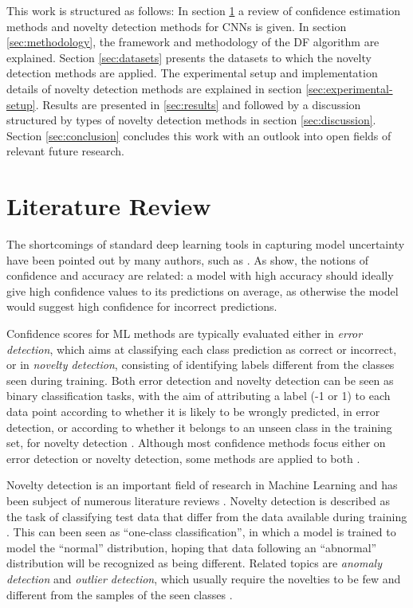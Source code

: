 \documentclass[10pt]{article}
\begin{document}
This work is structured as follows: In section \ref{sec:lit} a review of confidence estimation methods and novelty detection methods for \glspl{CNN} is given. In section \ref{sec:methodology}, the framework and methodology of the \acrlong{DF} algorithm are explained. Section \ref{sec:datasets} presents the datasets to which the novelty detection methods are applied. The experimental setup and implementation details of novelty detection methods are explained in section \ref{sec:experimental-setup}. Results are presented in \ref{sec:results} and followed by a discussion structured by types of novelty detection methods in section \ref{sec:discussion}. Section \ref{sec:conclusion} concludes this work with an outlook into open fields of relevant future research.

\section{Literature Review}
\label{sec:lit}

The shortcomings of standard deep learning tools in capturing model uncertainty have been pointed out by many authors, such as \textcite{ghahramani, NguyenYC14, mandelbaum17}. As \textcite{subramanya} show, the notions of confidence and accuracy are related: a model with high accuracy should ideally give high confidence values to its predictions on average, as otherwise the model would suggest high confidence for incorrect predictions.

Confidence scores for \gls{ML} methods are typically evaluated either in \textit{error detection}, which aims at classifying each class prediction as correct or incorrect, or in \textit{novelty detection}, consisting of identifying labels different from the classes seen during training. Both error detection and novelty detection can be seen as binary classification tasks, with the aim of attributing a label (-1 or 1) to each data point according to whether it is likely to be wrongly predicted, in error detection, or according to whether it belongs to an unseen class in the training set, for novelty detection \cite{Bahat_2018, mandelbaum17}. Although most confidence methods focus either on error detection or novelty detection, some methods are applied to both \cite{Sun2018KSconfA, Bahat_2018, mandelbaum17}.

Novelty detection is an important field of research in Machine Learning and has been subject of numerous literature reviews \cite{Bishop1994NoveltyDA, Markou2003NoveltyDApt1,Markou2003NoveltyDApt2,Pimentel2014ARO, deMorsier2014thesis}. Novelty detection is described as the task of classifying test data that differ from the data available during training \cite{Pimentel2014ARO}. This can been seen as ``one-class classification'', in which a model is trained to model the ``normal'' distribution, hoping that data following an ``abnormal'' distribution will be recognized as being different. Related topics are  \textit{anomaly detection} and \textit{outlier detection}, which usually require the novelties to be few and different from the samples of the seen classes \cite{deMorsier2014thesis, Pimentel2014ARO}.
\end{document}
